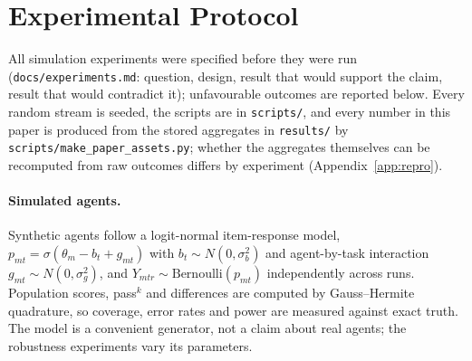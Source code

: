 \section{Experimental Protocol}\label{sec:protocol}
All simulation experiments were specified before they were run (\texttt{docs/experiments.md}: question, design, result that would support the claim, result that would contradict it); unfavourable outcomes are reported below. Every random stream is seeded, the scripts are in \texttt{scripts/}, and every number in this paper is produced from the stored aggregates in \texttt{results/} by \texttt{scripts/make\_paper\_assets.py}; whether the aggregates themselves can be recomputed from raw outcomes differs by experiment (Appendix~\ref{app:repro}).

\paragraph{Simulated agents.} Synthetic agents follow a logit-normal item-response model, $p_{mt}=\sigma(\theta_m-b_t+g_{mt})$ with $b_t\sim N(0,\sigma_b^2)$ and agent-by-task interaction $g_{mt}\sim N(0,\sigma_g^2)$, and $Y_{mtr}\sim\mathrm{Bernoulli}(p_{mt})$ independently across runs. Population scores, pass$^k$ and differences are computed by Gauss--Hermite quadrature, so coverage, error rates and power are measured against exact truth. The model is a convenient generator, not a claim about real agents; the robustness experiments vary its parameters.


